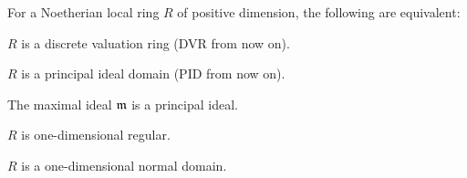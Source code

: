 \documentclass[a4paper,parskip=half,numbers=enddot, DIV=12, headheight=30pt]{scrreprt}
\begin{document}
\begin{thm}
    For a Noetherian local ring $R$ of positive dimension, the following are equivalent:
    \begin{alphanumerate}
    \item 
        $R$ is a discrete valuation ring (DVR from now on).
    \item 
        $R$ is a principal ideal domain (PID from now on).
    \item 
        The maximal ideal $\mathfrak{m}$ is a principal ideal.
    \item 
        $R$ is one-dimensional regular.
    \item 
        $R$ is a one-dimensional normal domain.
    \end{alphanumerate}
\end{thm}
\end{document}
